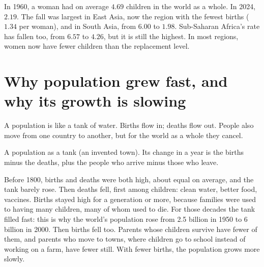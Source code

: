 In 1960, a woman had on average $4.69$ children in the world as a whole. In
2024, $2.19$. The fall was largest in East Asia, now the region with the fewest
births ($1.34$ per woman), and in South Asia, from $6.00$ to $1.98$. Sub-Saharan
Africa's rate has fallen too, from $6.57$ to $4.26$, but it is still the
highest. In most regions, women now have fewer children than the replacement
level.

\section{Why population grew fast, and why its growth is slowing}

A population is like a tank of water. Births flow in; deaths flow out. People
also move from one country to another, but for the world as a whole they cancel.

\begin{omfigure}

{\small A population as a tank (an invented town). Its change in a year is the
births minus the deaths, plus the people who arrive minus those who leave.}
\end{omfigure}

Before 1800, births and deaths were both high, about equal on average, and the
tank barely rose. Then deaths fell, first among children: clean water, better
food, vaccines. Births stayed high for a generation or more, because families
were used to having many children, many of whom used to die. For those decades
the tank filled fast: this is why the world's population rose from 2.5 billion
in 1950 to 6 billion in 2000. Then births fell too. Parents whose children
survive have fewer of them, and parents who move to towns, where children go to
school instead of working on a farm, have fewer still. With fewer births, the
population grows more slowly.

